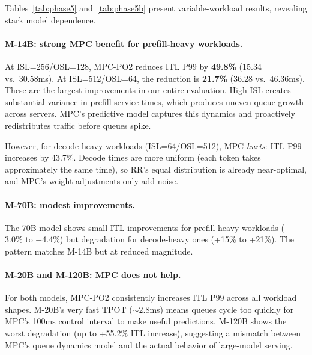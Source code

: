 \documentclass[runningheads]{llncs}
\begin{document}
Tables~\ref{tab:phase5} and~\ref{tab:phase5b} present variable-workload results, revealing stark model dependence.

\paragraph{M-14B: strong MPC benefit for prefill-heavy workloads.} At ISL=256/OSL=128, MPC-PO2 reduces ITL P99 by \textbf{49.8\%} (15.34 vs.\ 30.58ms). At ISL=512/OSL=64, the reduction is \textbf{21.7\%} (36.28 vs.\ 46.36ms). These are the largest improvements in our entire evaluation. High ISL creates substantial variance in prefill service times, which produces uneven queue growth across servers. MPC's predictive model captures this dynamics and proactively redistributes traffic before queues spike.

However, for decode-heavy workloads (ISL=64/OSL=512), MPC \textit{hurts}: ITL P99 increases by 43.7\%. Decode times are more uniform (each token takes approximately the same time), so RR's equal distribution is already near-optimal, and MPC's weight adjustments only add noise.

\paragraph{M-70B: modest improvements.} The 70B model shows small ITL improvements for prefill-heavy workloads ($-$3.0\% to $-$4.4\%) but degradation for decode-heavy ones (+15\% to +21\%). The pattern matches M-14B but at reduced magnitude.

\paragraph{M-20B and M-120B: MPC does not help.} For both models, MPC-PO2 consistently increases ITL P99 across all workload shapes. M-20B's very fast TPOT (${\sim}2.8$ms) means queues cycle too quickly for MPC's 100ms control interval to make useful predictions. M-120B shows the worst degradation (up to +55.2\% ITL increase), suggesting a mismatch between MPC's queue dynamics model and the actual behavior of large-model serving.
\end{document}
